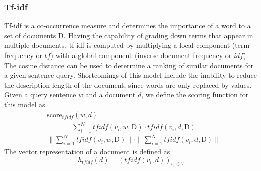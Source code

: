 \documentclass[a4paper]{article}
\begin{document}
\subsubsection{Tf-idf}
Tf-idf \cite{salton1986introduction} is a co-occurrence measure and determines the importance of a word to a set of documents $\text{D}$. Having the capability of grading down terms that appear in multiple documents, tf-idf is computed by multiplying a local component (term frequency or $tf$) with a global component (inverse document frequency or $idf$).
The cosine distance can be used to determine a ranking of similar documents for a given sentence query.
Shortcomings of this model include the inability to reduce the description length of the document, since words are only replaced by values.
Given a query sentence $w$ and a document $d$, we define the scoring function for this model as
\begin{equation}
\begin{aligned}
\label{eq:score_tfidf}
& \text{score}_{tfidf}(w, d) = \\ & \dfrac{\sum_{i=1}^{N} tfidf(v_i, w, \text{D}) \cdot tfidf(v_i, d, \text{D})} {\|\sum_{i=1}^{N} tfidf(v_i, w, \text{D}) \| \cdot \| \sum_{i=1}^{N} tfidf(v_i, d, \text{D})\|}
\end{aligned}
\end{equation}
The vector representation of a document is defined as
\begin{equation}
\label{eq:h_tfidf}
h_{tfidf}(d) = (tfidf(v_i, d))_{v_i \in V}
\end{equation}
\end{document}
